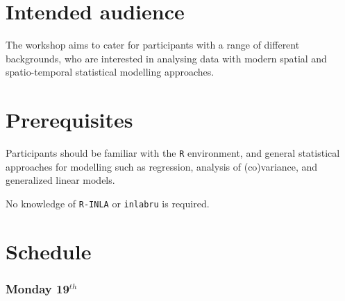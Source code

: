 \documentclass[
  letterpaper,
  DIV=11,
  numbers=noendperiod]{scrartcl}
\begin{document}
\section{Intended audience}\label{intended-audience}

The workshop aims to cater for participants with a range of different
backgrounds, who are interested in analysing data with modern spatial
and spatio-temporal statistical modelling approaches.

\section{Prerequisites}\label{prerequisites}

Participants should be familiar with the \texttt{R} environment, and
general statistical approaches for modelling such as regression,
analysis of (co)variance, and generalized linear models.

No knowledge of \texttt{R-INLA} or \texttt{inlabru} is required.

\section{Schedule}\label{schedule-tabs}

\subsubsection{\texorpdfstring{Monday 19\(^{th}\)}{Monday 19\^{}\{th\}}}
\end{document}
